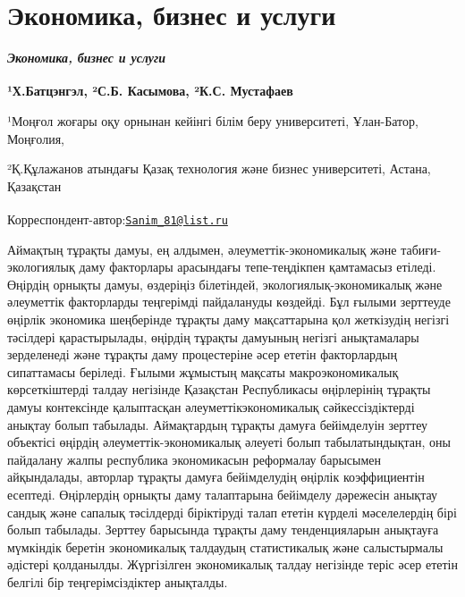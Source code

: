 \newpage
\let\cleardoublepage\clearpage
\part{Экономика, бизнес и услуги}
\begin{center}
{\large\bfseries\itshape Экономика, бизнес и услуги}
\end{center}

\begin{articleheader}

{\bfseries ¹Х.Батцэнгэл\textsuperscript{\envelope }, ²С.Б. Касымова, ²К.С.
Мустафаев}
\end{articleheader}
\begin{affiliation}
¹Моңғол жоғары оқу орнынан кейінгі білім беру университеті, Ұлан-Батор,
Моңғолия,

²Қ.Құлажанов атындағы Қазақ технология және бизнес университеті, Астана,
Қазақстан

\raggedright {\bfseries \textsuperscript{\envelope }}Корреспондент-автор:\href{mailto:Sanim_81@list.ru}{\nolinkurl{Sanim\_81@list.ru}}
\end{affiliation}

Аймақтың тұрақты дамуы, ең алдымен, әлеуметтік-экономикалық және
табиғи-экологиялық даму факторлары арасындағы тепе-теңдікпен қамтамасыз
етіледі. Өңірдің орнықты дамуы, өздеріңіз білетіндей,
экологиялық-экономикалық және әлеуметтік факторларды теңгерімді
пайдалануды көздейді. Бұл ғылыми зерттеуде өңірлік экономика шеңберінде
тұрақты даму мақсаттарына қол жеткізудің негізгі тәсілдері
қарастырылады, өңірдің тұрақты дамуының негізгі анықтамалары зерделенеді
және тұрақты даму процестеріне әсер ететін факторлардың сипаттамасы
беріледі. Ғылыми жұмыстың мақсаты макроэкономикалық көрсеткіштерді
талдау негізінде Қазақстан Республикасы өңірлерінің тұрақты дамуы
контексінде қалыптасқан әлеуметтік\-экономикалық сәйкессіздіктерді
анықтау болып табылады. Аймақтардың тұрақты дамуға бейімделуін зерттеу
объектісі өңірдің әлеуметтік-экономикалық әлеуеті болып табылатындықтан,
оны пайдалану жалпы республика экономикасын реформалау барысымен
айқындалады, авторлар тұрақты дамуға бейімделудің өңірлік коэффициентін
есептеді. Өңірлердің орнықты даму талаптарына бейімделу дәрежесін
анықтау сандық және сапалық тәсілдерді біріктіруді талап ететін күрделі
мәселелердің бірі болып табылады. Зерттеу барысында тұрақты даму
тенденцияларын анықтауға мүмкіндік беретін экономикалық талдаудың
статистикалық және салыстырмалы әдістері қолданылды. Жүргізілген
экономикалық талдау негізінде теріс әсер ететін белгілі бір
теңгерімсіздіктер анықталды.

